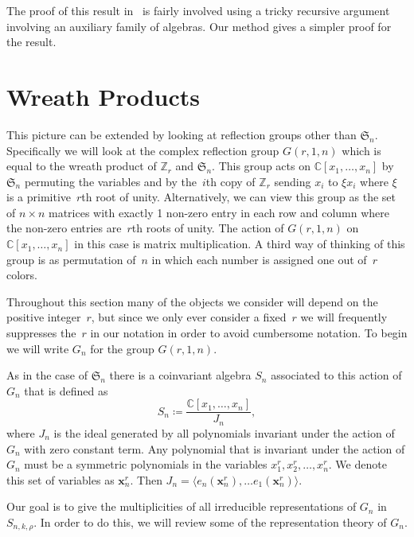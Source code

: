 \documentclass[ALCO,ThmDefs,Unicode,epreuves]{cedram}
\begin{document}
The proof of this result in~\cite{HRS} is fairly involved using a tricky recursive argument involving an auxiliary family of 
algebras. Our method gives a simpler proof for the result.



\section{Wreath Products}
\label{Wreath}

This picture can be extended by looking at reflection groups other than $\mathfrak{S}_n$. Specifically we will look at the 
complex reflection group $G(r,1,n)$ which is equal to the wreath product of $\mathbb{Z}_r$ and $\mathfrak{S}_n$. This group 
acts on $\mathbb{C}[x_1,\ldots, x_n]$ by $\mathfrak{S}_n$ permuting the variables and by the~$i$th copy of $\mathbb{Z}_r$ 
sending $x_i$ to $\xi x_i$ where $\xi$ is a primitive~$r$th root of unity. Alternatively, we can view this group as the set 
of $n\times n$ matrices with exactly 1 non-zero entry in each row and column where the non-zero entries are~$r$th roots of 
unity. The action of $G(r,1,n)$ on $\mathbb{C}[x_1,\ldots, x_n]$ in this case is matrix multiplication. A third way of 
thinking of this group is as permutation of~$n$ in which each number is assigned one out of~$r$ colors. 

Throughout this section many of the objects we consider will depend on the positive integer~$r$, but since we only ever 
consider a fixed~$r$ we will frequently suppresses the~$r$ in our notation in order to avoid cumbersome notation. To begin 
we will write $G_n$ for the group $G(r,1,n)$.

As in the case of $\mathfrak{S}_n$ there is a coinvariant algebra $S_n$ associated to this action of $G_n$ that is defined 
as
\begin{equation}
S_n\coloneqq \frac{\mathbb{C}[x_1,\ldots, x_n]}{J_n},
\end{equation}
where $J_n$ is the ideal generated by all 
polynomials invariant under the action of $G_n$ with zero constant term. Any polynomial that is invariant under the action of 
$G_n$ must be a symmetric polynomials in the variables $x_1^r,x_2^r,\ldots, x_n^r$. We denote this set of variables as 
$\mathbf{x}_n^r$. Then $J_n=\langle e_n(\mathbf{x}_n^r),\ldots e_1(\mathbf{x}_n^r)\rangle$.

Our goal is to give the multiplicities of all irreducible representations of $G_n$ in $S_{n,k,\rho}$. In order to do this, we 
will review some of the representation theory of $G_n$.
\end{document}
